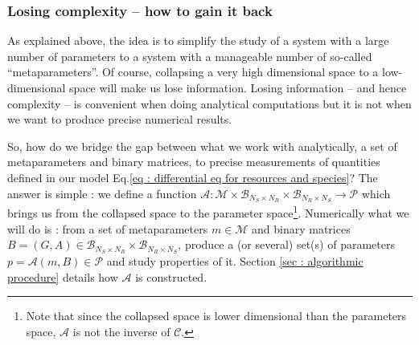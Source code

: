 \documentclass[12pt, titlepage]{report}
\begin{document}
\subsubsection{Losing complexity -- how to gain it back}
As explained above, the idea is to simplify the study of a system with a large number of parameters to a system with a manageable number of so-called ``metaparameters''. Of course, collapsing a very high dimensional space to a low-dimensional space will make us lose information. Losing information -- and hence complexity -- is convenient when doing analytical computations but it is not when we want to produce precise numerical results.

So, how do we bridge the gap between what we work with analytically, \ie a set of metaparameters and binary matrices, to precise measurements of quantities defined in our model Eq.\eqref{eq : differential eq for resources and species}? The answer is simple : we define a function $ \mathcal{A} : \mathcal{M} \times \mathcal{B}_{N_S\times N_R} \times \mathcal{B}_{N_R \times N_S} \rightarrow \mathcal{P} $ which brings us from the collapsed space to the parameter space\footnote{Note that since the collapsed space is lower dimensional than the parameters space, $\mathcal{A}$ is not the inverse of $\mathcal{C}$.}. Numerically what we will do is : from a set of metaparameters $m \in \mathcal{M}$ and binary matrices $B=(G, A) \in \mathcal{B}_{N_S \times N_R} \times \mathcal{B}_{N_R \times N_S}$, produce a (or several) set(s) of parameters $p = \mathcal{A}(m, B) \in \mathcal{P}$ and study properties of it. Section \ref{sec : algorithmic procedure} details how $\mathcal{A}$ is constructed.
\end{document}
